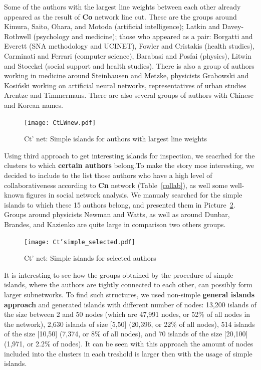 \documentclass[11pt]{article} %
\newcommand{\Remark}[1]{\ifodd\value{page} \normalmarginpar
 \else \reversemarginpar \fi \marginpar{{\footnotesize #1}} }
\begin{document}
Some of the authors with the largest line weights between each other already appeared as the result of \textbf{Co} network line cut. These are the groups around Kimura, Saito, Ohara, and Motoda (artificial intelligence); Latkin and Davey-Rothwell (psychology and medicine); those who appeared as a pair: Borgatti and Everett (SNA methodology and UCINET), Fowler and Cristakis (health studies), Carminati and Ferrari (computer science), Barabasi and Posfai (physics), Litwin and Stoeckel (social support and health studies). There is also a group of authors working in medicine around Steinhausen and Metzke, physicists Grabowski and Kosiński working on artificial neural networks, representatives of urban studies Arentze and Timmermans. There are also several groups of authors with Chinese and Korean names. \medskip
\Remark{Exclude Snijders from picture}

\begin{figure}
\begin{center}
\texttt{[image: CtLWnew.pdf]}
\end{center}
\caption{Ct' net: Simple islands for authors with largest line weights} \label{CtLargest}
\end{figure}

Using third approach to get interesting islands for inspection, we seacrhed for the clusters to which \textbf{certain authors} belong.To make the story moe interesting, we decided to include to the list those authors who have a high level of collaborativeness according to \textbf{Cn} network (Table~\ref{collab}), as well some well-known figures in social network analysis. We manualy searched for the simple islands to which these 15 authors belong, and presented them in Picture~\ref{CtSelAu}. Groups around physicists Newman and Watts, as well as around Dunbar, Brandes, and Kazienko are quite large in comparison two others groups. \medskip

\begin{figure}
\begin{center}
\texttt{[image: Ct'simple\_selected.pdf]}
\end{center}
\caption{Ct' net: Simple islands for selected authors} \label{CtSelAu}
\end{figure}


It is interesting to see how the groups obtained by the procedure of simple islands, where the authors are tightly connected to each other,  can possibly form larger subnetworks. To find such structures, we used non-simple \textbf{general islands approach} and generated islands with different number of nodes: 13,200 islands of the size between 2 and 50 nodes (which are 47,991 nodes, or 52\% of all nodes in the network), 2,630 islands of size [5,50] (20,396, or 22\% of all nodes), 514 islands of the size [10,50] (7,374, or 8\% of all nodes), and 70 islands of the size [20,100] (1,971, or 2.2\% of nodes). It can be seen with this approach the amount of nodes included into the clusters in each treshold is larger then with the usage of simple islands. \medskip 
\end{document}

